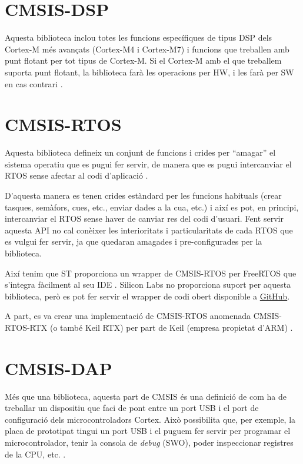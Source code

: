 \section{CMSIS-DSP}
\label{sec:CMSIS-DSP}
Aquesta biblioteca inclou totes les funcions específiques de tipus \gls{DSP} dels Cortex-M més avançats (Cortex-M4 i Cortex-M7) i funcions que treballen amb punt flotant per tot tipus de Cortex-M. Si el Cortex-M amb el que treballem suporta punt flotant, la biblioteca farà les operacions per HW, i les farà per SW en cas contrari \cite{CMSIS-DSP}\cite{AN0051}.

\section{CMSIS-RTOS}
\label{sec:CMSIS-RTOS}
Aquesta biblioteca defineix un conjunt de funcions i crides per ``amagar'' el sistema operatiu que es pugui fer servir, de manera que es pugui intercanviar el \gls{RTOS} sense afectar al codi d'aplicació \cite{CMSIS-RTOS}.

D'aquesta manera es tenen crides estàndard per les funcions habituals (crear tasques, semàfors, cues, etc., enviar dades a la cua, etc.) i així es pot, en principi, intercanviar el RTOS sense haver de canviar res del codi d'usuari. Fent servir aquesta API no cal conèixer les interioritats i particularitats de cada RTOS que es vulgui fer servir, ja que quedaran amagades i pre-configurades per la biblioteca.

Així tenim que ST proporciona un \gls{wrapper} de CMSIS-RTOS per FreeRTOS que s'integra fàcilment al seu IDE \cite{ST-CMSIS-RTOS}. Silicon Labs no proporciona suport per aquesta biblioteca, però es pot fer servir el \gls{wrapper} de codi obert disponible a \href{https://github.com/labapart/polymcu/tree/master/RTOS/FreeRTOS/cmsis}{GitHub}.

A part, es va crear una implementació de CMSIS-RTOS anomenada CMSIS-RTOS-RTX (o també Keil RTX) per part de Keil (empresa propietat d'ARM) \cite{Keil-RTX}.

\section{CMSIS-DAP}
\label{sec:CMSIS-DAP}
Més que una biblioteca, aquesta part de CMSIS és una definició de com ha de treballar un dispositiu que faci de pont entre un port USB i el port de configuració dels microcontroladors Cortex. Això possibilita que, per exemple, la placa de prototipat tingui un port USB i el puguem fer servir per programar el microcontrolador, tenir la consola de {\em debug} (SWO), poder inspeccionar registres de la CPU, etc. \cite{CMSIS-DAP}.

